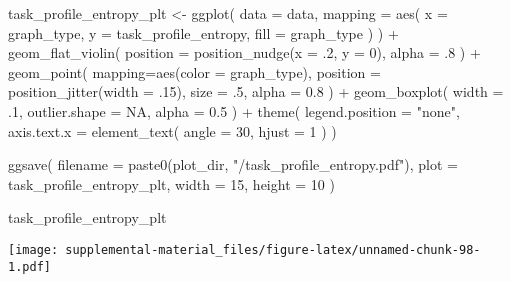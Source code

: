 \documentclass[
]{book}
\newenvironment{Shaded}{\begin{snugshade}}{\end{snugshade}}
\newcommand{\AttributeTok}[1]{\textcolor[rgb]{0.77,0.63,0.00}{#1}}
\newcommand{\ConstantTok}[1]{\textcolor[rgb]{0.00,0.00,0.00}{#1}}
\newcommand{\DecValTok}[1]{\textcolor[rgb]{0.00,0.00,0.81}{#1}}
\newcommand{\FloatTok}[1]{\textcolor[rgb]{0.00,0.00,0.81}{#1}}
\newcommand{\FunctionTok}[1]{\textcolor[rgb]{0.00,0.00,0.00}{#1}}
\newcommand{\NormalTok}[1]{#1}
\newcommand{\OtherTok}[1]{\textcolor[rgb]{0.56,0.35,0.01}{#1}}
\newcommand{\SpecialCharTok}[1]{\textcolor[rgb]{0.00,0.00,0.00}{#1}}
\newcommand{\StringTok}[1]{\textcolor[rgb]{0.31,0.60,0.02}{#1}}
\begin{document}
\begin{Shaded}
\begin{Highlighting}[]
\NormalTok{task\_profile\_entropy\_plt }\OtherTok{\textless{}{-}} \FunctionTok{ggplot}\NormalTok{(}
    \AttributeTok{data =}\NormalTok{ data,}
    \AttributeTok{mapping =} \FunctionTok{aes}\NormalTok{(}
      \AttributeTok{x =}\NormalTok{ graph\_type,}
      \AttributeTok{y =}\NormalTok{ task\_profile\_entropy,}
      \AttributeTok{fill =}\NormalTok{ graph\_type}
\NormalTok{    )}
\NormalTok{  ) }\SpecialCharTok{+}
  \FunctionTok{geom\_flat\_violin}\NormalTok{(}
    \AttributeTok{position =} \FunctionTok{position\_nudge}\NormalTok{(}\AttributeTok{x =}\NormalTok{ .}\DecValTok{2}\NormalTok{, }\AttributeTok{y =} \DecValTok{0}\NormalTok{),}
    \AttributeTok{alpha =}\NormalTok{ .}\DecValTok{8}
\NormalTok{  ) }\SpecialCharTok{+}
  \FunctionTok{geom\_point}\NormalTok{(}
    \AttributeTok{mapping=}\FunctionTok{aes}\NormalTok{(}\AttributeTok{color =}\NormalTok{ graph\_type),}
    \AttributeTok{position =} \FunctionTok{position\_jitter}\NormalTok{(}\AttributeTok{width =}\NormalTok{ .}\DecValTok{15}\NormalTok{),}
    \AttributeTok{size =}\NormalTok{ .}\DecValTok{5}\NormalTok{,}
    \AttributeTok{alpha =} \FloatTok{0.8}
\NormalTok{  ) }\SpecialCharTok{+}
  \FunctionTok{geom\_boxplot}\NormalTok{(}
    \AttributeTok{width =}\NormalTok{ .}\DecValTok{1}\NormalTok{,}
    \AttributeTok{outlier.shape =} \ConstantTok{NA}\NormalTok{,}
    \AttributeTok{alpha =} \FloatTok{0.5}
\NormalTok{  ) }\SpecialCharTok{+}
  \FunctionTok{theme}\NormalTok{(}
    \AttributeTok{legend.position =} \StringTok{"none"}\NormalTok{,}
    \AttributeTok{axis.text.x =} \FunctionTok{element\_text}\NormalTok{(}
      \AttributeTok{angle =} \DecValTok{30}\NormalTok{,}
      \AttributeTok{hjust =} \DecValTok{1}
\NormalTok{    )}
\NormalTok{  )}

\FunctionTok{ggsave}\NormalTok{(}
  \AttributeTok{filename =} \FunctionTok{paste0}\NormalTok{(plot\_dir, }\StringTok{"/task\_profile\_entropy.pdf"}\NormalTok{),}
  \AttributeTok{plot =}\NormalTok{ task\_profile\_entropy\_plt,}
  \AttributeTok{width =} \DecValTok{15}\NormalTok{,}
  \AttributeTok{height =} \DecValTok{10}
\NormalTok{)}

\NormalTok{task\_profile\_entropy\_plt}
\end{Highlighting}
\end{Shaded}

\texttt{[image: supplemental-material\_files/figure-latex/unnamed-chunk-98-1.pdf]}
\end{document}
